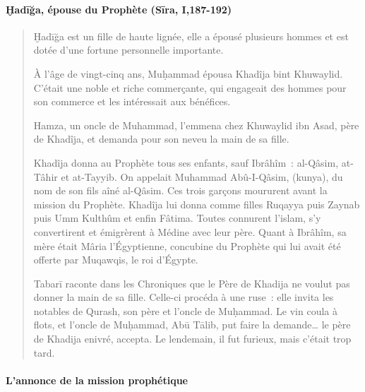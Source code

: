 \paragraph{Ḫadīğa, épouse du Prophète (Sīra,
I,187-192)}
\begin{quotation}
    
Ḫadīğa est un fille de haute lignée, elle a épousé plusieurs hommes et
est dotée d'une fortune personnelle importante.

À l'âge de vingt-cinq ans, Muḥammad épousa Khadîja bint Khuwaylid.
C'était une noble et riche commerçante, qui engageait des hommes pour
son commerce et les intéressait aux bénéfices.

Hamza, un oncle de Muhammad, l'emmena chez Khuwaylid ibn Asad, père de
Khadîja, et demanda pour son neveu la main de sa fille.

Khadîja donna au Prophète tous ses enfants, sauf Ibrâhîm~: al-Qâsim,
at-Tâhir et at-Tayyib. On appelait Muhammad Abû-I-Qâsim, (kunya), du nom
de son fils aîné al-Qâsim. Ces trois garçons moururent avant la mission
du Prophète. Khadîja lui donna comme filles Ruqayya puis Zaynab puis Umm
Kulthûm et enfin Fâtima. Toutes connurent l'islam, s'y convertirent et
émigrèrent à Médine avec leur père. Quant à Ibrâhîm, sa mère était Mâria
l'Égyptienne, concubine du Prophète qui lui avait été offerte par
Muqawqis, le roi d'Égypte.

Tabarī raconte dans les Chroniques que le Père de Khadija ne voulut pas
donner la main de sa fille. Celle-ci procéda à une ruse~: elle invita
les notables de Qurash, son père et l'oncle de Muḥammad. Le vin coula à
flots, et l'oncle de Muḥammad, Abū Tālib, put faire la demande\ldots{}
le père de Khadija enivré, accepta. Le lendemain, il fut furieux, mais
c'était trop tard.
\end{quotation}


\paragraph{L'annonce de la mission prophétique
}

